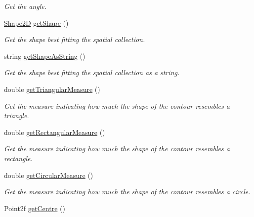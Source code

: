 \begin{DoxyCompactItemize}
\begin{DoxyCompactList}\small\item\em \-Get the angle. \end{DoxyCompactList}\item 
\hyperlink{namespacemultiscale_1_1analysis_ad1ef6155ab2e954c1c33d3e2e6b53fbf}{\-Shape2\-D} \hyperlink{classmultiscale_1_1analysis_1_1SpatialEntityPseudo3D_af67de0727472a72bad311e71db8a1115}{get\-Shape} ()
\begin{DoxyCompactList}\small\item\em \-Get the shape best fitting the spatial collection. \end{DoxyCompactList}\item 
string \hyperlink{classmultiscale_1_1analysis_1_1SpatialEntityPseudo3D_aaf8b45d68041be0f293eaf1bf40c76d3}{get\-Shape\-As\-String} ()
\begin{DoxyCompactList}\small\item\em \-Get the shape best fitting the spatial collection as a string. \end{DoxyCompactList}\item 
double \hyperlink{classmultiscale_1_1analysis_1_1SpatialEntityPseudo3D_a9c7af7e1fc6a829c184c85baeaf1ebc2}{get\-Triangular\-Measure} ()
\begin{DoxyCompactList}\small\item\em \-Get the measure indicating how much the shape of the contour resembles a triangle. \end{DoxyCompactList}\item 
double \hyperlink{classmultiscale_1_1analysis_1_1SpatialEntityPseudo3D_a924e390a408a91abf394f29bec33d945}{get\-Rectangular\-Measure} ()
\begin{DoxyCompactList}\small\item\em \-Get the measure indicating how much the shape of the contour resembles a rectangle. \end{DoxyCompactList}\item 
double \hyperlink{classmultiscale_1_1analysis_1_1SpatialEntityPseudo3D_a71759aa55f43ac2a6cc52b738f3b2c42}{get\-Circular\-Measure} ()
\begin{DoxyCompactList}\small\item\em \-Get the measure indicating how much the shape of the contour resembles a circle. \end{DoxyCompactList}\item 
\-Point2f \hyperlink{classmultiscale_1_1analysis_1_1SpatialEntityPseudo3D_a4976534b2cdf55541701a7d5ea4ac0c5}{get\-Centre} ()

\end{DoxyCompactItemize}
